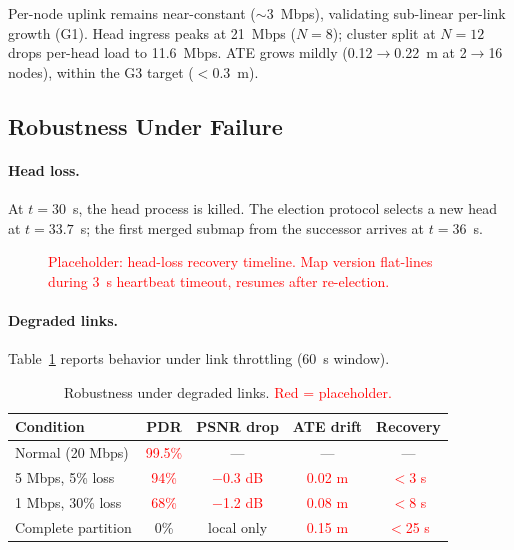 Per-node uplink remains near-constant ($\sim$3~Mbps), validating
sub-linear per-link growth (G1). Head ingress peaks at 21~Mbps ($N=8$); cluster
split at $N=12$ drops per-head load to 11.6~Mbps. ATE grows mildly
(0.12$\to$0.22~m at 2$\to$16 nodes), within the G3 target ($<$0.3~m).

\subsection{Robustness Under Failure}

\paragraph{Head loss.} At $t=30$~s, the head process is killed. The election
protocol selects a new head at $t=33.7$~s; the first merged submap from
the successor arrives at $t=36$~s.

\begin{figure}[t]
  \centering
  \resizebox{\columnwidth}{!}{}
  \caption{\textcolor{red}{Placeholder: head-loss recovery timeline. Map
  version flat-lines during 3~s heartbeat timeout, resumes after re-election.}}
  \label{fig:head_loss}
\end{figure}

\paragraph{Degraded links.} Table~\ref{tab:robustness} reports behavior
under link throttling (60~s window).

\begin{table}[t]
  \centering
  \caption{Robustness under degraded links. \textcolor{red}{Red = placeholder.}}
  \label{tab:robustness}
  \footnotesize
  \setlength{\tabcolsep}{3.5pt}
  \begin{tabular}{@{}lcccc@{}}
    \toprule
    Condition & PDR & PSNR drop & ATE drift & Recovery \\
    \midrule
    Normal (20 Mbps)    & \textcolor{red}{99.5\%} & --- & --- & --- \\
    5 Mbps, 5\% loss    & \textcolor{red}{94\%}   & \textcolor{red}{$-$0.3 dB} & \textcolor{red}{0.02 m} & \textcolor{red}{$<$3 s} \\
    1 Mbps, 30\% loss   & \textcolor{red}{68\%}   & \textcolor{red}{$-$1.2 dB} & \textcolor{red}{0.08 m} & \textcolor{red}{$<$8 s} \\
    Complete partition  & 0\%     & local only & \textcolor{red}{0.15 m} & \textcolor{red}{$<$25 s} \\
    \bottomrule
  \end{tabular}
\end{table}

